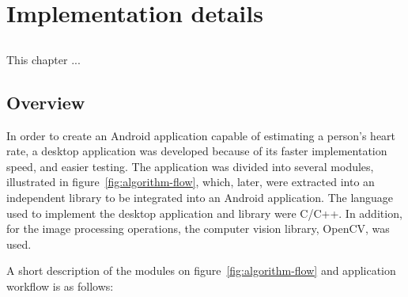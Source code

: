 \chapter{Implementation details} \label{chap:impl}

\section*{}


This chapter ...

\section{Overview} \label{sec:sol:overview}


In order to create an Android application capable of estimating a person's
heart rate, a desktop application was developed because of its faster
implementation speed, and easier testing.
The application was divided into several modules, illustrated in
figure~\ref{fig:algorithm-flow}, which, later, were extracted into an
independent library to be integrated into an Android application.
The language used to implement the desktop application and library
were C/C++. In addition, for the image processing operations, the
computer vision library, OpenCV, was used.

A short description of the modules on figure~\ref{fig:algorithm-flow} and
application workflow is as follows:

